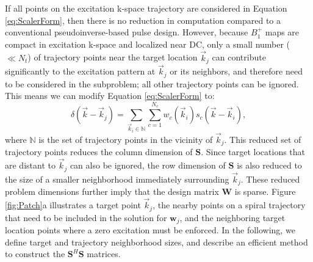 \par If all points on the excitation k-space trajectory are considered in Equation \ref{eq:ScalerForm},
then there is no reduction in computation compared to a conventional pseudoinverse-based pulse design.
However, because $B_1^+$ maps are compact in excitation k-space and localized near DC,
only a small number ($\ll N_t$) of trajectory points near the target location $\vec{k}_j$ can contribute significantly
to the excitation pattern at $\vec{k}_j$ or its neighbors, 
and therefore need to be considered in the subproblem;
all other trajectory points can be ignored.
This means we can modify Equation \ref{eq:ScalerForm} to:
\begin{equation}
\delta(\vec{k}-\vec{k}_j) = \sum_{\vec{k}_i \in \mathbb{N}}\sum_{c=1}^{N_c} w_c(\vec{k}_i) s_c(\vec{k}-\vec{k}_i),
\end{equation} 
where $\mathbb{N}$ is the set of trajectory points in the vicinity of $\vec{k}_j$. 
This reduced set of trajectory points reduces the column dimension of $\bm{S}$.
Since target locations that are distant to $\vec{k}_j$ can also be ignored,
the row dimension of $\bm{S}$ is also reduced to the size of a smaller neighborhood immediately surrounding $\vec{k}_j$. 
These reduced problem dimensions further imply that the design matrix $\bm{W}$ is sparse. 
Figure \ref{fig:Patch}a illustrates a target point $\vec{k}_j$, 
the nearby points on a spiral trajectory that need to be included in the solution for $\bm{w}_j$,
and the neighboring target location points where a zero excitation must be enforced. 
In the following, we define target and trajectory neighborhood sizes, and describe an efficient 
method to construct the $\bm{S}^{H}\bm{S}$ matrices.


